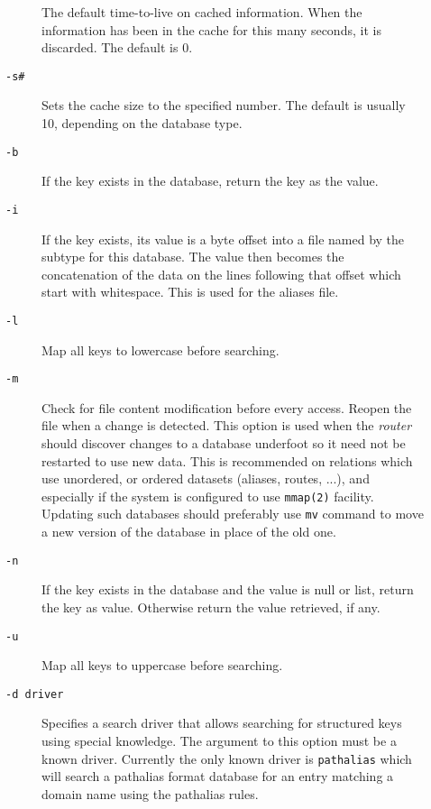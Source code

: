 \begin{description}
\begin{description}
The default time-to-live on cached information. 
When the information has been in the cache for this many seconds, it 
is discarded. The default is 0. 

\item[{\tt -s\#}] \mbox{}

Sets the cache size to the specified number. 
The default is usually 10, depending on the database type. 

\item[{\tt -b}] \mbox{}

If the key exists in the database, return the key 
as the value. 

\item[{\tt -i}] \mbox{}

If the key exists, its value is a byte offset into 
a file named by the subtype for this database. The value then becomes 
the concatenation of the data on the lines following that offset which 
start with whitespace. This is used for the aliases file. 

\item[{\tt -l}] \mbox{}

Map all keys to lowercase before searching.

\item[{\tt -m}] \mbox{}

Check for file content modification before every 
access. Reopen the file when a change is detected. This option is 
used when the {\em router\/} should discover changes to a database
underfoot so it need not be restarted to use new data. This is 
recommended on relations which use unordered, or ordered datasets 
(aliases, routes, ...), and especially if the system is configured 
to use {\tt mmap(2)} facility. Updating such databases should 
preferably use {\tt mv} command to move a new version of the 
database in place of the old one. 

\item[{\tt -n}] \mbox{}

If the key exists in the database and the value is 
null or list, return the key as value. Otherwise return the value 
retrieved, if any. 

\item[{\tt -u}] \mbox{}

Map all keys to uppercase before searching. 

\item[{\tt -d driver}] \mbox{}

Specifies a search driver that allows
searching for structured keys using special knowledge. The 
argument to this option must be a known driver. Currently the 
only known driver is {\tt pathalias} which will search a
pathalias format database for an entry matching a domain name 
using the pathalias rules.


\end{description}
\end{description}

